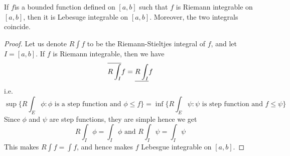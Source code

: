 \begin{theorem}\label{10.1.3}
    If $f$is a bounded function defined on  $[a,b]$ such that $f$ is Riemann
    integrable on  $[a,b]$, then it is Lebesuge integrable on $[a,b]$. Moreover,
    the two integrals coincide.
\end{theorem}
\begin{proof}
    Let us denote $R\int{f}$ to be the Riemann-Stieltjes integral of $f$, and
    let  $I=[a,b]$. If $f$ is Riemann integrable, then we have
    \begin{equation*}
        \overline{R\int_I}{f}=\underline{R\int_I}{f}
    \end{equation*}
    i.e.
    \begin{equation*}
        \sup{\{R\int_E{\phi} : \phi \text{ is a step function and } \phi \leq f\}}=
        \inf{\{R\int_E{\psi} : \psi \text{ is step function and } f \leq \psi\}}
    \end{equation*}
    Since $\phi$ and  $\psi$ are step functions, they are simple hence we get
    \begin{equation*}
        R\int_I{\phi}=\int_I{\phi} \text{ and } R\int_I{\psi}=\int_I{\psi}
    \end{equation*}
    This makes $R\int{f}=\int{f}$, and hence makes $f$ Lebesgue integrable on
    $[a,b]$.
\end{proof}
